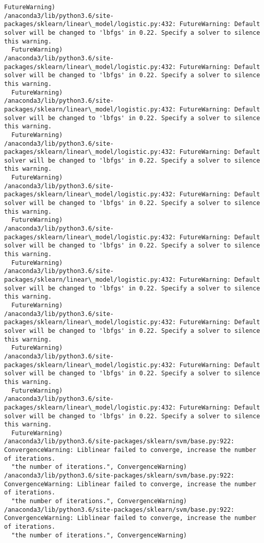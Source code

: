 \documentclass[11pt]{article}
\begin{document}
\begin{Verbatim}[commandchars=\\\{\}]
  FutureWarning)
/anaconda3/lib/python3.6/site-packages/sklearn/linear\_model/logistic.py:432: FutureWarning: Default solver will be changed to 'lbfgs' in 0.22. Specify a solver to silence this warning.
  FutureWarning)
/anaconda3/lib/python3.6/site-packages/sklearn/linear\_model/logistic.py:432: FutureWarning: Default solver will be changed to 'lbfgs' in 0.22. Specify a solver to silence this warning.
  FutureWarning)
/anaconda3/lib/python3.6/site-packages/sklearn/linear\_model/logistic.py:432: FutureWarning: Default solver will be changed to 'lbfgs' in 0.22. Specify a solver to silence this warning.
  FutureWarning)
/anaconda3/lib/python3.6/site-packages/sklearn/linear\_model/logistic.py:432: FutureWarning: Default solver will be changed to 'lbfgs' in 0.22. Specify a solver to silence this warning.
  FutureWarning)
/anaconda3/lib/python3.6/site-packages/sklearn/linear\_model/logistic.py:432: FutureWarning: Default solver will be changed to 'lbfgs' in 0.22. Specify a solver to silence this warning.
  FutureWarning)
/anaconda3/lib/python3.6/site-packages/sklearn/linear\_model/logistic.py:432: FutureWarning: Default solver will be changed to 'lbfgs' in 0.22. Specify a solver to silence this warning.
  FutureWarning)
/anaconda3/lib/python3.6/site-packages/sklearn/linear\_model/logistic.py:432: FutureWarning: Default solver will be changed to 'lbfgs' in 0.22. Specify a solver to silence this warning.
  FutureWarning)
/anaconda3/lib/python3.6/site-packages/sklearn/linear\_model/logistic.py:432: FutureWarning: Default solver will be changed to 'lbfgs' in 0.22. Specify a solver to silence this warning.
  FutureWarning)
/anaconda3/lib/python3.6/site-packages/sklearn/linear\_model/logistic.py:432: FutureWarning: Default solver will be changed to 'lbfgs' in 0.22. Specify a solver to silence this warning.
  FutureWarning)
/anaconda3/lib/python3.6/site-packages/sklearn/linear\_model/logistic.py:432: FutureWarning: Default solver will be changed to 'lbfgs' in 0.22. Specify a solver to silence this warning.
  FutureWarning)
/anaconda3/lib/python3.6/site-packages/sklearn/svm/base.py:922: ConvergenceWarning: Liblinear failed to converge, increase the number of iterations.
  "the number of iterations.", ConvergenceWarning)
/anaconda3/lib/python3.6/site-packages/sklearn/svm/base.py:922: ConvergenceWarning: Liblinear failed to converge, increase the number of iterations.
  "the number of iterations.", ConvergenceWarning)
/anaconda3/lib/python3.6/site-packages/sklearn/svm/base.py:922: ConvergenceWarning: Liblinear failed to converge, increase the number of iterations.
  "the number of iterations.", ConvergenceWarning)

\end{Verbatim}
\end{document}
